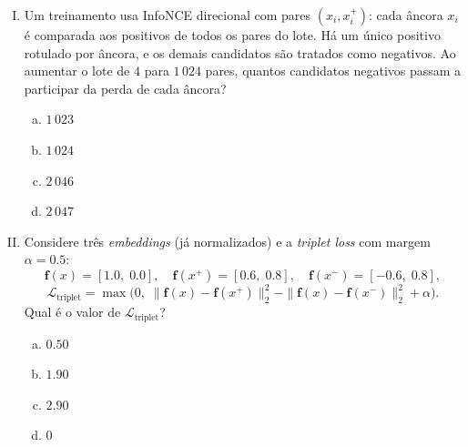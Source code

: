 \documentclass{dlproblemset}
\begin{document}
\begin{enumerate}[I)]
\begin{enumerate}[a)]
    \item $10\,000\times$
    \item $25\,000\times$
    \item $50\,000\times$
    \item $100\,000\times$
\end{enumerate}

\item Um treinamento usa InfoNCE direcional com pares $(x_i,x_i^+)$:
      cada âncora $x_i$ é comparada aos positivos de todos os pares do lote.
      Há um único positivo rotulado por âncora, e os demais candidatos
      são tratados como negativos.
      Ao aumentar o lote de $4$ para $1\,024$ pares, quantos candidatos
      negativos passam a participar da perda de cada âncora?

\begin{enumerate}[a)]
    \item $1\,023$
    \item $1\,024$
    \item $2\,046$
    \item $2\,047$
\end{enumerate}

\item Considere três \textit{embeddings}
      (já normalizados) e a \textit{triplet loss} com margem $\alpha = 0.5$:
      \[
        \mathbf{f}(x) = [1.0,\;0.0], \quad
        \mathbf{f}(x^+) = [0.6,\;0.8], \quad
        \mathbf{f}(x^-) = [-0.6,\;0.8],
      \]
      \[
        \mathcal{L}_{\text{triplet}} = \max\!\bigl(0,\;
          \|\mathbf{f}(x)-\mathbf{f}(x^+)\|_2^2 - \|\mathbf{f}(x)-\mathbf{f}(x^-)\|_2^2 + \alpha\bigr).
      \]
      Qual é o valor de $\mathcal{L}_{\text{triplet}}$?

\begin{enumerate}[a)]
    \item $0.50$
    \item $1.90$
    \item $2.90$
    \item $0$
\end{enumerate}


\end{enumerate}
\end{document}
